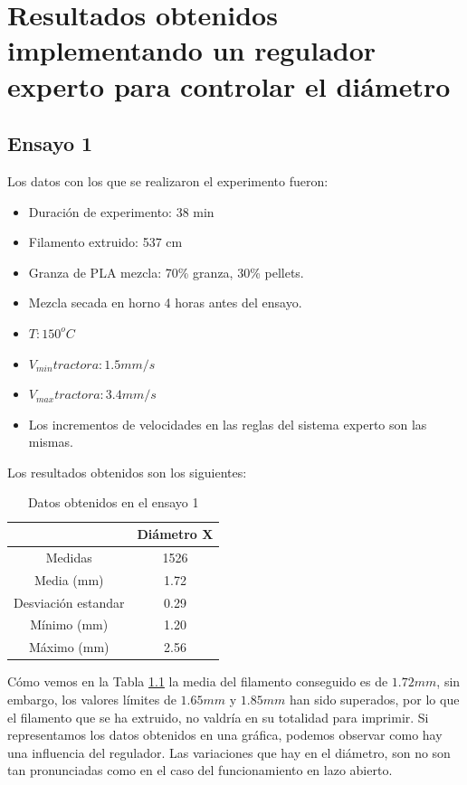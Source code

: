 \chapter[Resultados obtenidos implementando un regulador experto.]{Resultados obtenidos implementando un regulador experto para controlar el diámetro}
\label{ane:resultados_regu}
\section{Ensayo 1}

Los datos con los que se realizaron el experimento fueron:

\begin{itemize}
	\item{Duración de experimento: 38 min}
	\item{Filamento extruido: 537 cm}
	\item{Granza de PLA mezcla: 70\% granza, 30\% pellets.}
	\item{Mezcla secada en horno 4 horas antes del ensayo.}
	\item{$T: 150^oC$}
	\item{$V_{min} tractora: 1.5 mm/s$}
	\item{$V_{max} tractora: 3.4 mm/s$}
	\item{Los incrementos de velocidades en las reglas del sistema experto son las mismas.}
\end{itemize}

Los resultados obtenidos son los siguientes:

\begin{table}[H]
	\centering
	\begin{tabular}{cc}
		                    & Diámetro X \\ \hline
		Medidas             & 1526       \\
		Media (mm)          & 1.72       \\
		Desviación estandar & 0.29       \\
		Mínimo (mm)         & 1.20       \\
		Máximo (mm)         & 2.56      
	\end{tabular}
	\caption{Datos obtenidos en el ensayo 1}
	\label{tab:resl_ens1}
\end{table}

Cómo vemos en la Tabla \ref{tab:resl_ens1} la media del filamento conseguido es de $1.72 mm$, sin embargo, los valores límites de $1.65 mm$ y $1.85 mm$ han sido superados, por lo que el filamento que se ha extruido, no valdría en su totalidad para imprimir. Si representamos los datos obtenidos en una gráfica, podemos observar como hay una influencia del regulador. Las variaciones que hay en el diámetro, son no son tan pronunciadas como en el caso del funcionamiento en lazo abierto. \\

